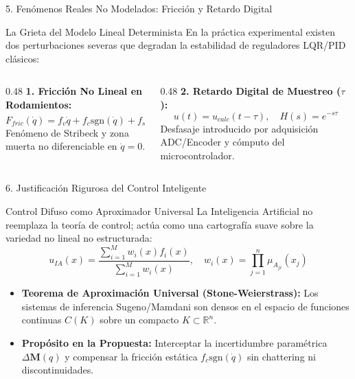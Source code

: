 \documentclass[10pt,aspectratio=169]{beamer}
\begin{document}
\begin{frame}{5. Fenómenos Reales No Modelados: Fricción y Retardo Digital}
  \begin{alertblock}{La Grieta del Modelo Lineal Determinista}
    En la práctica experimental existen dos perturbaciones severas que degradan la estabilidad de reguladores LQR/PID clásicos:
  \end{alertblock}

  \vspace{0.2cm}
  \begin{columns}[T]
    \begin{column}{0.48\textwidth}
      \textbf{1. Fricción No Lineal en Rodamientos:}
      \begin{equation*}
        F_{fric}(\dot{q}) = f_v \dot{q} + f_c \text{sgn}(\dot{q}) + f_s e^{-(\dot{q}/\dot{q}_s)^2}\text{sgn}(\dot{q})
      \end{equation*}
      \small Fenómeno de Stribeck y zona muerta no diferenciable en $\dot{q}=0$.
    \end{column}
    \begin{column}{0.48\textwidth}
      \textbf{2. Retardo Digital de Muestreo ($\tau$):}
      \begin{equation*}
        u(t) = u_{calc}(t - \tau), \quad H(s) = e^{-s\tau}
      \end{equation*}
      \small Desfasaje introducido por adquisición ADC/Encoder y cómputo del microcontrolador.
    \end{column}
  \end{columns}
\end{frame}

\begin{frame}{6. Justificación Rigurosa del Control Inteligente}
  \begin{block}{Control Difuso como Aproximador Universal}
    La Inteligencia Artificial no reemplaza la teoría de control; actúa como una cartografía suave sobre la variedad no lineal no estructurada:
    \begin{equation*}
      u_{IA}(x) = \frac{\sum_{i=1}^M w_i(x) f_i(x)}{\sum_{i=1}^M w_i(x)}, \quad w_i(x) = \prod_{j=1}^n \mu_{A_{ji}}(x_j)
    \end{equation*}
  \end{block}

  \begin{itemize}
    \item \textbf{Teorema de Aproximación Universal (Stone-Weierstrass):} Los sistemas de inferencia Sugeno/Mamdani son densos en el espacio de funciones continuas $C(K)$ sobre un compacto $K \subset \mathbb{R}^n$.
    \item \textbf{Propósito en la Propuesta:} Interceptar la incertidumbre paramétrica $\Delta \mathbf{M}(q)$ y compensar la fricción estática $f_c \text{sgn}(\dot{q})$ sin chattering ni discontinuidades.
  \end{itemize}
\end{frame}
\end{document}
